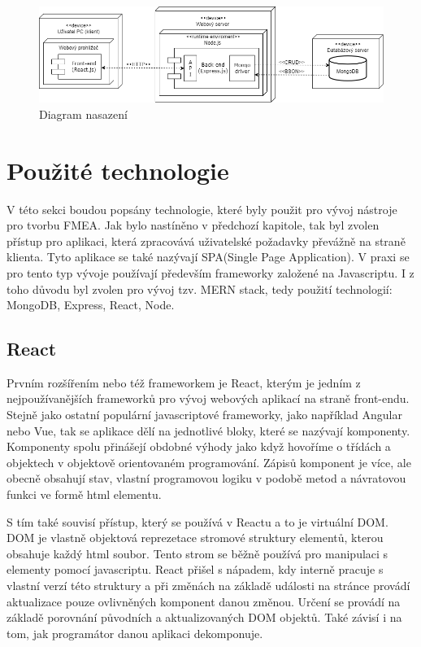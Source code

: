 \begin{figure}[h]
\centering
	\includegraphics[width=1.0\textwidth]{Figures/deploymentDiagram.png}
	\caption{Diagram nasazení}
	\label{fig:architecture}
\end{figure}

\section{Použité technologie}
V této sekci boudou popsány technologie, které byly použit pro vývoj nástroje pro tvorbu FMEA. Jak bylo nastíněno v předchozí kapitole, tak byl zvolen přístup pro aplikaci, která zpracovává uživatelské požadavky převážně na straně klienta. Tyto aplikace se také nazývají SPA(Single Page Application). V praxi se pro tento typ vývoje používají především frameworky založené na Javascriptu. I z toho důvodu byl zvolen pro vývoj tzv. MERN stack, tedy použití technologií: MongoDB, Express, React, Node. 
\subsection{React}
\label{subsection:react}
\cite{react}Prvním rozšířením nebo též frameworkem je React, kterým je jedním z nejpoužívanějších frameworků pro vývoj webových aplikací na straně front-endu. Stejně jako ostatní populární javascriptové frameworky, jako například Angular nebo Vue, tak se aplikace dělí na jednotlivé bloky, které se nazývají komponenty. Komponenty spolu přinášejí obdobné výhody jako když hovoříme o třídách a objektech v objektově orientovaném programování. Zápisů komponent je více, ale obecně obsahují stav, vlastní programovou logiku v podobě metod a návratovou funkci ve formě html elementu.  

S tím také souvisí přístup, který se používá v Reactu a to je virtuální DOM. DOM je vlastně objektová reprezetace stromové struktury elementů, kterou obsahuje každý html soubor. Tento strom se běžně používá pro manipulaci s elementy pomocí javascriptu. React přišel s nápadem, kdy interně pracuje s vlastní verzí této struktury a při změnách na základě události na stránce provádí aktualizace pouze ovlivněných komponent danou změnou. Určení se provádí na základě porovnání původních a aktualizovaných DOM objektů. Také závisí i na tom, jak programátor danou aplikaci dekomponuje. 

